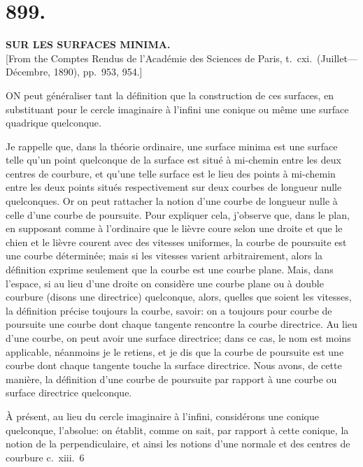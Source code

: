 \documentclass[11pt,a4paper]{article}
\begin{document}
\section*{899.}
\begin{center}
{\large\bfseries SUR LES SURFACES MINIMA.}\\[0.5em]
\small [From the Comptes Rendus de l'Acad\'emie des Sciences de Paris, t.\ cxi.\ (Juillet---D\'ecembre, 1890), pp.\ 953, 954.]
\end{center}

ON peut g\'en\'eraliser tant la d\'efinition que la construction de ces surfaces, en substituant pour le cercle imaginaire \`a l'infini une conique ou m\^eme une surface quadrique quelconque.

Je rappelle que, dans la th\'eorie ordinaire, une surface minima est une surface telle qu'un point quelconque de la surface est situ\'e \`a mi-chemin entre les deux centres de courbure, et qu'une telle surface est le lieu des points \`a mi-chemin entre les deux points situ\'es respectivement sur deux courbes de longueur nulle quelconques. Or on peut rattacher la notion d'une courbe de longueur nulle \`a celle d'une courbe de poursuite. Pour expliquer cela, j'observe que, dans le plan, en supposant comme \`a l'ordinaire que le li\`evre coure selon une droite et que le chien et le li\`evre courent avec des vitesses uniformes, la courbe de poursuite est une courbe d\'etermin\'ee; mais si les vitesses varient arbitrairement, alors la d\'efinition exprime seulement que la courbe est une courbe plane. Mais, dans l'espace, si au lieu d'une droite on consid\`ere une courbe plane ou \`a double courbure (disons une directrice) quelconque, alors, quelles que soient les vitesses, la d\'efinition pr\'ecise toujours la courbe, savoir: on a toujours pour courbe de poursuite une courbe dont chaque tangente rencontre la courbe directrice. Au lieu d'une courbe, on peut avoir une surface directrice; dans ce cas, le nom est moins applicable, n\'eanmoins je le retiens, et je dis que la courbe de poursuite est une courbe dont chaque tangente touche la surface directrice. Nous avons, de cette mani\`ere, la d\'efinition d'une courbe de poursuite par rapport \`a une courbe ou surface directrice quelconque.

\`A pr\'esent, au lieu du cercle imaginaire \`a l'infini, consid\'erons une conique quelconque, l'absolue: on \'etablit, comme on sait, par rapport \`a cette conique, la notion de la perpendiculaire, et ainsi les notions d'une normale et des centres de courbure c.\ xiii.\ 6
\end{document}
